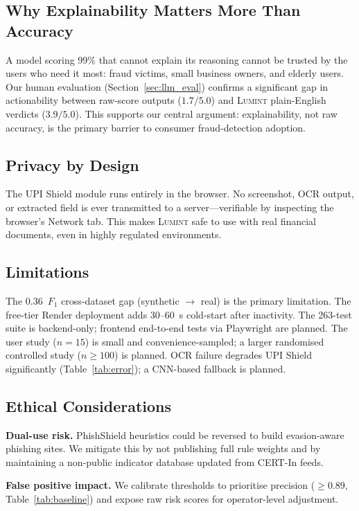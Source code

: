 \documentclass[conference]{IEEEtran}
\begin{document}
\subsection{Why Explainability Matters More Than Accuracy}
A model scoring 99\% that cannot explain its reasoning cannot be trusted
by the users who need it most: fraud victims, small business owners, and
elderly users.
Our human evaluation (Section~\ref{sec:llm_eval}) confirms a significant
gap in actionability between raw-score outputs ($1.7/5.0$) and
\textsc{Lumint} plain-English verdicts ($3.9/5.0$).
This supports our central argument: explainability, not raw accuracy, is
the primary barrier to consumer fraud-detection adoption.

\subsection{Privacy by Design}
The UPI Shield module runs entirely in the browser.
No screenshot, OCR output, or extracted field is ever transmitted to a
server---verifiable by inspecting the browser's Network tab.
This makes \textsc{Lumint} safe to use with real financial documents,
even in highly regulated environments.

\subsection{Limitations}
The 0.36~$F_1$ cross-dataset gap (synthetic $\to$ real) is the primary
limitation.
The free-tier Render deployment adds 30--60~s cold-start after
inactivity.
The 263-test suite is backend-only; frontend end-to-end tests via
Playwright are planned.
The user study ($n{=}15$) is small and convenience-sampled; a larger
randomised controlled study ($n{\geq}100$) is planned.
OCR failure degrades UPI Shield significantly
(Table~\ref{tab:error}); a CNN-based fallback is planned.

\subsection{Ethical Considerations}
\textbf{Dual-use risk.}
PhishShield heuristics could be reversed to build evasion-aware phishing
sites.
We mitigate this by not publishing full rule weights and by maintaining a
non-public indicator database updated from CERT-In feeds.

\textbf{False positive impact.}
We calibrate thresholds to prioritise precision (${\geq}0.89$,
Table~\ref{tab:baseline}) and expose raw risk scores for
operator-level adjustment.
\end{document}
